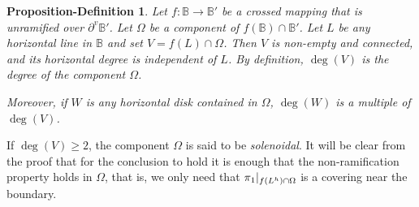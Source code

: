 \documentclass[oneside, 12pt]{amsart}
\newcommand{\fr}{\partial}
\newcommand{\rest}[1]{ \arrowvert_{#1}}
\newcommand{\bb}{\mathbb{B}}
\theoremstyle{plain}
\newtheorem{propdef}[thm]{Proposition-Definition}
\theoremstyle{definition}
\numberwithin{equation}{section}       %
\numberwithin{equation}{section}       %
\begin{document}
\begin{propdef}\label{propdef:non-ramified}
Let $f:\bb\to \bb'$ be a crossed mapping that is unramified over $\fr^v\bb'$.
Let $\Omega$ be a component of $f(\bb)\cap \bb'$. 
Let $L$ be any horizontal line in $\bb$ and set $V = f(L)\cap \Omega$. 
Then $V$ is non-empty and connected, and its horizontal degree is independent of $L$. 
By definition, $\deg(V)$ is the \emph{degree} of the component $\Omega$.
 
Moreover, if  $W$ is any horizontal disk  contained in $\Omega$, $\deg(W)$ is a multiple of $\deg(V)$.  
\end{propdef}

 If $\deg(V)\geq 2$, the component  $\Omega$ is  said to be \emph{solenoidal}. 
 It will be clear from the proof that for the conclusion to hold 
 it is enough that 
 the non-ramification property holds   in $\Omega$, that is, we only need that 
$\pi_1\rest{f(L^h)\cap\Omega}$ is a  covering  near the boundary. 
\end{document}
